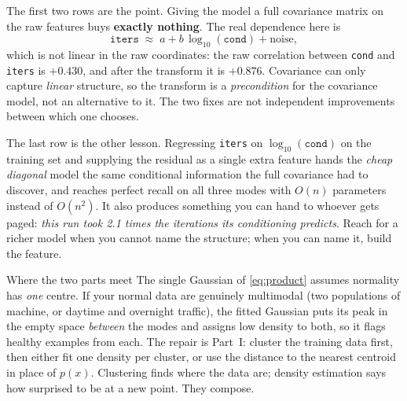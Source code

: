 \documentclass[11pt,a4paper]{article}
\begin{document}
The first two rows are the point. Giving the model a full covariance matrix on
the raw features buys \textbf{exactly nothing}. The real dependence here is
\[
\texttt{iters} \;\approx\; a + b\,\log_{10}(\texttt{cond}) + \text{noise},
\]
which is not linear in the raw coordinates: the raw correlation between
\texttt{cond} and \texttt{iters} is $+0.430$, and after the transform it is
$+0.876$. Covariance can only capture \emph{linear} structure, so the
transform is a \emph{precondition} for the covariance model, not an
alternative to it. The two fixes are not independent improvements between
which one chooses.

The last row is the other lesson. Regressing \texttt{iters} on
$\log_{10}(\texttt{cond})$ on the training set and supplying the residual as a
single extra feature hands the \emph{cheap diagonal} model the same
conditional information the full covariance had to discover, and reaches
perfect recall on all three modes with $O(n)$ parameters instead of $O(n^2)$.
It also produces something you can hand to whoever gets paged: \emph{this run
took 2.1 times the iterations its conditioning predicts}. Reach for a richer
model when you cannot name the structure; when you can name it, build the
feature.

\begin{keybox}{Where the two parts meet}
The single Gaussian of \eqref{eq:product} assumes normality has \emph{one}
centre. If your normal data are genuinely multimodal (two populations of
machine, or daytime and overnight traffic), the fitted Gaussian puts its peak
in the empty space \emph{between} the modes and assigns low density to both,
so it flags healthy examples from each. The repair is Part~I: cluster the
training data first, then either fit one density per cluster, or use the
distance to the nearest centroid in place of $p(x)$. Clustering finds where
the data are; density estimation says how surprised to be at a new point.
They compose.
\end{keybox}
\end{document}
